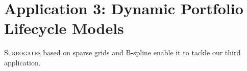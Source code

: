 
\chapter{Application 3: Dynamic Portfolio Lifecycle Models}

\lettrine{S}{urrogates}
based on sparse grids and B-spline enable it to tackle our third application.
\blindtext{}






\cleardoublepage
